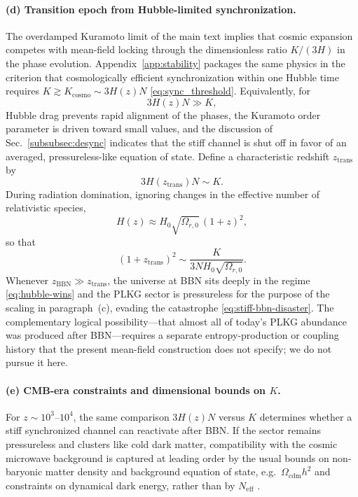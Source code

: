 \paragraph{(d) Transition epoch from Hubble-limited synchronization.}
The overdamped Kuramoto limit of the main text implies that cosmic expansion competes with mean-field locking through the dimensionless ratio $K/(3H)$ in the phase evolution.
Appendix~\ref{app:stability} packages the same physics in the criterion that cosmologically efficient synchronization within one Hubble time requires $K\gtrsim K_{\mathrm{cosmo}}\sim 3H(z)N$ \eqref{eq:sync_threshold}.
Equivalently, for
\begin{equation}
3H(z)N \gg K,
\label{eq:hubble-wins}
\end{equation}
Hubble drag prevents rapid alignment of the phases, the Kuramoto order parameter is driven toward small values, and the discussion of Sec.~\ref{subsubsec:desync} indicates that the stiff channel is shut off in favor of an averaged, pressureless-like equation of state.
Define a characteristic redshift $z_{\mathrm{trans}}$ by
\begin{equation}
3H(z_{\mathrm{trans}})N \sim K.
\label{eq:ztrans-def}
\end{equation}
During radiation domination, ignoring changes in the effective number of relativistic species,
\begin{equation}
H(z)\approx H_0\sqrt{\Omega_{r,0}}\,(1+z)^2,
\label{eq:H-rad-approx}
\end{equation}
so that
\begin{equation}
(1+z_{\mathrm{trans}})^2\sim\frac{K}{3N H_0\sqrt{\Omega_{r,0}}}.
\label{eq:ztrans-scaling}
\end{equation}
Whenever $z_{\mathrm{BBN}}\gg z_{\mathrm{trans}}$, the universe at BBN sits deeply in the regime \eqref{eq:hubble-wins} and the PLKG sector is pressureless for the purpose of the scaling in paragraph~(c), evading the catastrophe \eqref{eq:stiff-bbn-disaster}.
The complementary logical possibility---that almost all of today's PLKG abundance was produced after BBN---requires a separate entropy-production or coupling history that the present mean-field construction does not specify; we do not pursue it here.

\paragraph{(e) CMB-era constraints and dimensional bounds on $K$.}
For $z\sim 10^{3}$--$10^{4}$, the same comparison $3H(z)N$ versus $K$ determines whether a stiff synchronized channel can reactivate after BBN.
If the sector remains pressureless and clusters like cold dark matter, compatibility with the cosmic microwave background is captured at leading order by the usual bounds on non-baryonic matter density and background equation of state, e.g.\ $\Omega_{\mathrm{cdm}}h^2$ and constraints on dynamical dark energy, rather than by $N_{\mathrm{eff}}$ \cite{Planck2018}.

